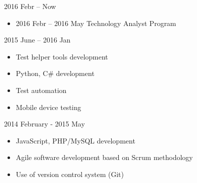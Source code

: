 {
  2016 Febr -- Now
  \begin{itemize}%
  \item 2016 Febr -- 2016 May Technology Analyst Program
  \end{itemize}
}

{
  2015 June -- 2016 Jan
  \begin{itemize}%
  \item Test helper tools development
  \item Python, C\# development
  \item Test automation
  \item Mobile device testing
  \end{itemize}
}

{
  2014 February - 2015 May
  \begin{itemize}%
  \item JavaScript, PHP/MySQL development
  \item Agile software development based on Scrum methodology
  \item Use of version control system (Git)
  \end{itemize}
}

